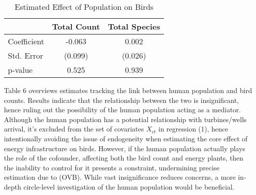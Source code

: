 \documentclass{article}
\begin{document}
\begin{table}[H]
\centering
\caption{Estimated Effect of Population on Birds}
\begin{tabular}{lcc}
\toprule
 & \textbf{Total Count} & \textbf{Total Species} \\
\midrule
Coefficient & -0.063 & 0.002 \\
Std. Error  & (0.099) & (0.026) \\
p-value     & 0.525 & 0.939 \\
\bottomrule
\end{tabular}
\end{table}


\addlinespace

Table 6 overviews estimates tracking the link between human population and bird counts. Results indicate that the relationship between the two is insignificant, hence ruling out the possibility of the human population acting as a mediator. Although the human population has a potential relationship with turbines/wells arrival, it's excluded from the set of covariates \( X_{ct} \) in regression (1), hence intentionally avoiding the issue of endogeneity when estimating the core effect of energy infrastructure on birds. However, if the human population actually plays the role of the cofounder, affecting both the bird count and energy plants, then the inability to control for it presents a constraint, undermining precise estimation due to (OVB). While vast insignificance reduces concerns, a more in-depth circle-level investigation of the human population would be beneficial.
\end{document}
